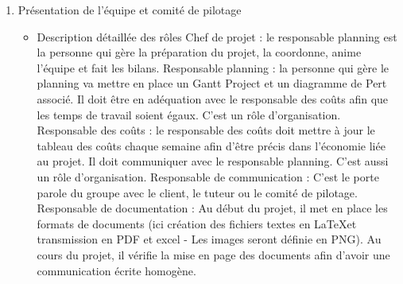 \documentclass[11pt]{report}
\begin{document}
\begin{enumerate}
	\item \LARGE Présentation de l'équipe et comité de pilotage
    	\begin{itemize} \large
    	    \item Description détaillée des rôles
    	    \newline Chef de projet : le responsable planning est la personne qui gère la préparation du projet, la coordonne, anime l'équipe et fait les bilans.
    	    \newline Responsable planning : la personne qui gère le planning va mettre en place un Gantt Project et un diagramme de Pert associé. Il doit être en adéquation avec le responsable des coûts afin que les temps de travail soient égaux. C'est un rôle d'organisation.
    	    \newline Responsable des coûts : le responsable des coûts doit mettre à jour le tableau des coûts chaque semaine afin d'être précis dans l'économie liée au projet. Il doit communiquer avec le responsable planning. C'est aussi un rôle d'organisation.
    	    \newline Responsable de communication : C'est le porte parole du groupe avec le client, le tuteur ou le comité de pilotage. 
    	    \newline Responsable de documentation : Au début du projet, il met en place les formats de documents (ici création des fichiers textes en \LaTeX \space et transmission en PDF et excel - Les images seront définie en PNG). Au cours du projet, il vérifie la mise en page des documents afin d'avoir une communication écrite homogène. 
    	    

\end{itemize}
\end{enumerate}
\end{document}
